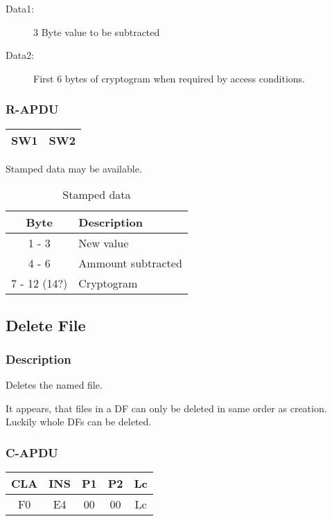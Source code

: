 \documentclass[a4paper,oneside]{article}
\begin{document}
\begin{description}
\item[Data1:] 3 Byte value to be subtracted
\item[Data2:] First 6 bytes of cryptogram when required by access conditions.
\end{description}

\subsubsection*{R-APDU}

\begin{tabular}{|c|c|} \hline
SW1 & SW2 \\ \hline
\end{tabular}

Stamped data may be available.

\begin{table}[h!]
\caption{Stamped data}
\begin{center}
\begin{tabular}{|c|l|} \hline
Byte & Description \\ \hline \hline
1 - 3 & New value \\ \hline
4 - 6 & Ammount subtracted \\ \hline
7 - 12 (14?) & Cryptogram \\ \hline
\end{tabular}
\end{center}
\end{table}


\subsection{Delete File}

\subsubsection*{Description}

Deletes the named file.

It appears, that files in a DF can only be deleted in same order
as creation. Luckily whole DFs can be deleted.

\subsubsection*{C-APDU}

\begin{tabular}{|c|c|c|c|c|} \hline
CLA & INS & P1 & P2 & Lc \\ \hline \hline
F0 & E4 & 00 & 00 & Lc \\ \hline
\end{tabular}
\end{document}
